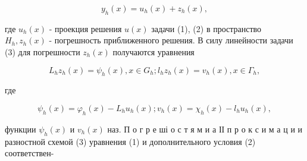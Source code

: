 \documentclass[10pt]{article}
\begin{document}
\[

y_{h}(x)=u_{h}(x)+z_{h}(x),

\]



где $u_{h}(x)$ - проекция решения $u(x)$ задачи (1), (2) в пространство $H_{h}, z_{h}(x)$ - погрешность приближенного решения. В силу линейности задачи (3) для погрешности $z_{h}(x)$ получаются уравнения



\[

L_{h} z_{h}(x)=\psi_{h}(x), x \in G_{h} ; l_{h} z_{h}(x)=v_{h}(x), x \in \Gamma_{h},

\]



где



\[

\psi_{h}(x)=\varphi_{h}(x)-L_{h} u_{h}(x) ; v_{h}(x)=\chi_{h}(x)-l_{h} u_{h}(x),

\]



функции $\psi_{h}(x)$ и $v_{h}(x)$ наз. П о г р е ші о с т я м и а ІІ п р о к с и м а ц и и разностной схемой (3) уравнения (1) и дополнительного условия (2) соответствен-
\end{document}
